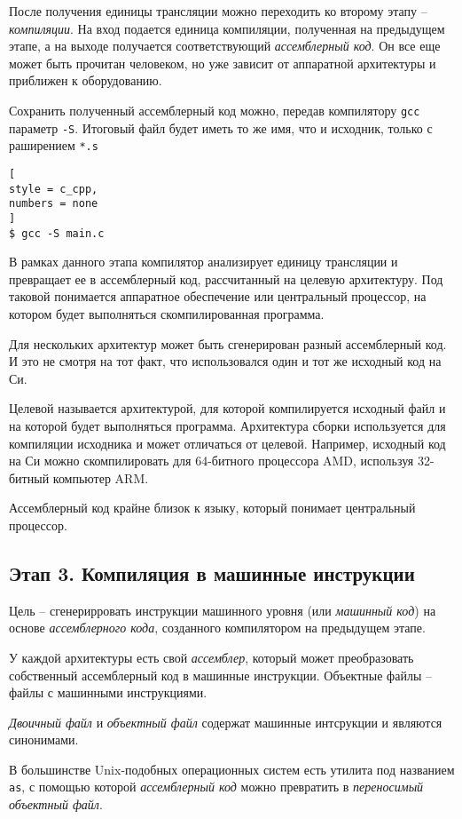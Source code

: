 \documentclass[%
	11pt,
	a4paper,
	utf8,
		]{article}
\begin{document}
После получения единицы трансляции можно переходить ко второму этапу -- \emph{компиляции}. На вход подается единица компиляции, полученная на предыдущем этапе, а на выходе получается соответствующий \emph{ассемблерный код}. Он все еще может быть прочитан человеком, но уже зависит от аппаратной архитектуры и приближен к оборудованию. 

Сохранить полученный ассемблерный код можно, передав компилятору \verb|gcc| параметр \verb|-S|. Итоговый файл будет иметь то же имя, что и исходник, только с раширением \verb|*.s|
\begin{lstlisting}[
style = c_cpp,
numbers = none
]
$ gcc -S main.c
\end{lstlisting}

В рамках данного этапа компилятор анализирует единицу трансляции и превращает ее в ассемблерный код, рассчитанный на целевую архитектуру. Под таковой понимается аппаратное обеспечение или центральный процессор, на котором будет выполняться скомпилированная программа.

Для нескольких архитектур может быть сгенерирован разный ассемблерный код. И это не смотря на тот факт, что использовался один и тот же исходный код на Си. 

Целевой называется архитектурой, для которой компилируется исходный файл и на которой будет выполняться программа. Архитектура сборки используется для компиляции исходника и может отличаться от целевой. Например, исходный код на Си можно скомпилировать для 64-битного процессора AMD, используя 32-битный компьютер ARM.

Ассемблерный код крайне близок к языку, который понимает центральный процессор.

\subsection{Этап 3. Компиляция в машинные инструкции}

Цель -- сгенерирровать инструкции машинного уровня (или \emph{машинный код}) на основе \emph{ассемблерного кода}, созданного компилятором на предыдущем этапе. 

У каждой архитектуры есть свой \emph{ассемблер}, который может преобразовать собственный ассемблерный код в машинные инструкции. Объектные файлы -- файлы с машинными инструкциями.

\emph{Двоичный файл} и \emph{объектный файл} содержат машинные интсрукции и являются синонимами.

В большинстве Unix-подобных операционных систем есть утилита под названием \verb|as|, с помощью которой \emph{ассемблерный код} можно превратить в \emph{переносимый объектный файл}.
\end{document}
